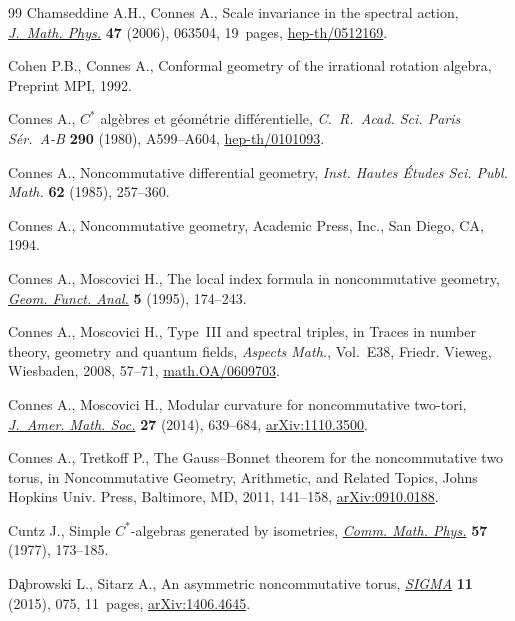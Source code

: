 \documentclass[pdftex]{sigma}
\numberwithin{equation}{section}
\begin{document}
\begin{thebibliography}{99}
Chamseddine A.H., Connes A., Scale invariance in the spectral action,
 \href{http://dx.doi.org/10.1063/1.2196748}{\textit{J.~Math. Phys.}} \textbf{47} (2006), 063504, 19~pages,
 \href{http://arxiv.org/abs/hep-th/0512169}{hep-th/0512169}.

Cohen P.B., Connes A., Conformal geometry of the irrational rotation algebra,
 {P}reprint MPI, 1992.

Connes A., {$C^{\ast}$} alg\`ebres et g\'eom\'etrie dif\/f\'erentielle,
 \textit{C.~R.~Acad. Sci. Paris S\'er.~A-B} \textbf{290} (1980), A599--A604,
 \href{http://arxiv.org/abs/hep-th/0101093}{hep-th/0101093}.

Connes A., Noncommutative dif\/ferential geometry, \textit{Inst. Hautes \'Etudes
 Sci. Publ. Math.} \textbf{62} (1985), 257--360.

Connes A., Noncommutative geometry, Academic Press, Inc., San Diego, CA, 1994.

Connes A., Moscovici H., The local index formula in noncommutative geometry,
 \href{http://dx.doi.org/10.1007/BF01895667}{\textit{Geom. Funct. Anal.}} \textbf{5} (1995), 174--243.

Connes A., Moscovici H., Type~{III} and spectral triples, in Traces in number
 theory, geometry and quantum f\/ields, \textit{Aspects Math.}, Vol.~E38,
 Friedr. Vieweg, Wiesbaden, 2008, 57--71, \href{http://arxiv.org/abs/math.OA/0609703}{math.OA/0609703}.

Connes A., Moscovici H., Modular curvature for noncommutative two-tori,
 \href{http://dx.doi.org/10.1090/S0894-0347-2014-00793-1}{\textit{J.~Amer. Math. Soc.}} \textbf{27} (2014), 639--684,
 \href{http://arxiv.org/abs/1110.3500}{arXiv:1110.3500}.

Connes A., Tretkof\/f P., The {G}auss--{B}onnet theorem for the noncommutative
 two torus, in Noncommutative Geometry, Arithmetic, and Related Topics, Johns
 Hopkins Univ. Press, Baltimore, MD, 2011, 141--158, \href{http://arxiv.org/abs/0910.0188}{arXiv:0910.0188}.

Cuntz J., Simple {$C^*$}-algebras generated by isometries, \href{http://dx.doi.org/10.1007/BF01625776}{\textit{Comm. Math.
 Phys.}} \textbf{57} (1977), 173--185.

D{\c{a}}browski L., Sitarz A., An asymmetric noncommutative torus,
 \href{http://dx.doi.org/10.3842/SIGMA.2015.075}{\textit{SIGMA}} \textbf{11} (2015), 075, 11~pages, \href{http://arxiv.org/abs/1406.4645}{arXiv:1406.4645}.


\end{thebibliography}
\end{document}
